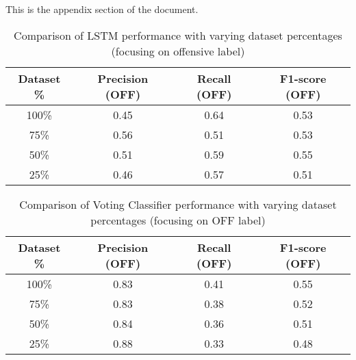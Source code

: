 \documentclass[11pt]{article}
\begin{document}
This is the appendix section of the document.



\begin{table}[h]
\centering
\begin{tabular}{|c|c|c|c|}
\hline
\textbf{Dataset \%} & \textbf{Precision (OFF)} & \textbf{Recall (OFF)} & \textbf{F1-score (OFF)} \\ \hline
100\%               & 0.45                     & 0.64                  & 0.53                    \\ \hline
75\%                & 0.56                     & 0.51                  & 0.53                    \\ \hline
50\%                & 0.51                     & 0.59                  & 0.55                    \\ \hline
25\%                & 0.46                     & 0.57                  & 0.51                    \\ \hline
\end{tabular}
\caption{Comparison of LSTM performance with varying dataset percentages (focusing on offensive label)}
\label{table:lstm_performance_comparison_offensive}
\end{table}

\begin{table}[h]
\centering
\begin{tabular}{|c|c|c|c|}
\hline
\textbf{Dataset \%} & \textbf{Precision (OFF)} & \textbf{Recall (OFF)} & \textbf{F1-score (OFF)} \\ \hline
100\%               & 0.83                     & 0.41                  & 0.55                    \\ \hline
75\%                & 0.83                     & 0.38                  & 0.52                    \\ \hline
50\%                & 0.84                     & 0.36                  & 0.51                    \\ \hline
25\%                & 0.88                     & 0.33                  & 0.48                    \\ \hline
\end{tabular}
\caption{Comparison of Voting Classifier performance with varying dataset percentages (focusing on OFF label)}
\label{table:voting_classifier_performance_comparison_off}
\end{table}
\end{document}
